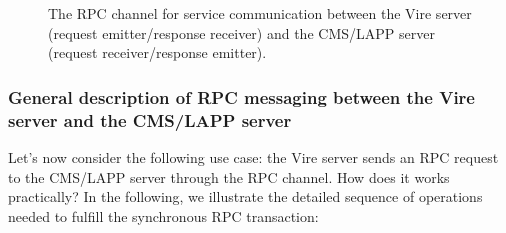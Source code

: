 \begin{figure}[h]
\begin{center}
\scalebox{0.9}{}
\end{center}
\caption{The RPC  channel for  service communication between  the Vire
  server (request  emitter/response receiver) and the  CMS/LAPP server
  (request receiver/response emitter).}\label{fig:cmslapp_rpc:arch_0}
\end{figure}


\vfill
\afterpage{\clearpage}
\pagebreak

\subsubsection{General description of RPC messaging between the Vire server and the CMS/LAPP server}

Let's now  consider the following use  case: the Vire server  sends an
RPC request to  the CMS/LAPP server through the RPC  channel. How does
it works  practically?  In the  following, we illustrate  the detailed
sequence  of   operations  needed  to  fulfill   the  synchronous  RPC
transaction:

